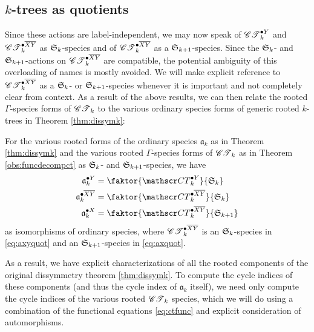 \documentclass[sectionflow,singlespace,twoside,boldmathhdr,draft]{brandiss} %
\numberwithin{section}{chapter}
\numberwithin{figure}{chapter}
\begin{document}
\subsection{$k$-trees as quotients}\label{ss:ktquot}
Since these actions are label-independent, we may now speak of $\pointed[Y]{\specname{CT}}_{k}$ and $\pointed[\overline{XY}]{\specname{CT}}_{k}$ as $\symgp{k}$-species and of $\pointed[\overline{XY}]{\specname{CT}}_{k}$ as a $\symgp{k+1}$-species.
Since the $\symgp{k}$- and $\symgp{k+1}$-actions on $\pointed[\overline{XY}]{\specname{CT}}_{k}$ are compatible, the potential ambiguity of this overloading of names is mostly avoided.
We will make explicit reference to $\pointed[\overline{XY}]{\specname{CT}}_{k}$ as a $\symgp{k}$- or $\symgp{k+1}$-species whenever it is important and not completely clear from context.
As a result of the above results, we can then relate the rooted $\Gamma$-species forms of $\specname{CT}_{k}$ to the various ordinary species forms of generic rooted $k$-trees in Theorem \ref{thm:dissymk}:
\begin{theorem}
  \label{thm:arootquot}
  For the various rooted forms of the ordinary species $\mathfrak{a}_{k}$ as in Theorem \ref{thm:dissymk} and the various rooted $\Gamma$-species forms of $\specname{CT}_{k}$ as in Theorem \ref{obs:funcdecompct} as $\symgp{k}$- and $\symgp{k+1}$-species, we have
  \begin{subequations}
    \label{eq:arootquot}
    \begin{align}
      \pointed[Y]{\mathfrak{a}}_{k} &= \faktor{\pointed[Y]{\specname{CT}}_{k}}{\symgp{k}} \label{eq:ayquot} \\
      \pointed[\overline{XY}]{\mathfrak{a}}_{k} &= \faktor{\pointed[\overline{XY}]{\specname{CT}}_{k}}{\symgp{k}} \label{eq:axyquot} \\
      \pointed[X]{\mathfrak{a}}_{k} &= \faktor{\pointed[\overline{XY}]{\specname{CT}}_{k}}{\symgp{k+1}} \label{eq:axquot}
    \end{align}
  \end{subequations}
  as isomorphisms of ordinary species, where $\pointed[\overline{XY}]{\specname{CT}}_{k}$ is an $\symgp{k}$-species in \eqref{eq:axyquot} and an $\symgp{k+1}$-species in \eqref{eq:axquot}.
\end{theorem}

As a result, we have explicit characterizations of all the rooted components of the original dissymmetry theorem \ref{thm:dissymk}.
To compute the cycle indices of these components (and thus the cycle index of $\mathfrak{a}_{k}$ itself), we need only compute the cycle indices of the various rooted $\specname{CT}_{k}$ species, which we will do using a combination of the functional equations \eqref{eq:ctfunc} and explicit consideration of automorphisms.
\end{document}
